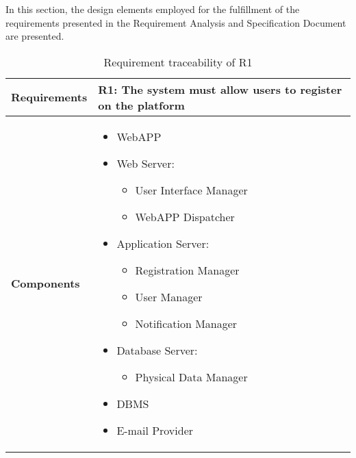 In this section, the design elements employed for the fulfillment of the requirements presented in the Requirement Analysis and Specification Document are presented.

\begin{table}[h!]
    \centering
    \begin{tabular}{|p{3cm}|p{12cm}|}    \hline
        \textbf{Requirements} & R1: The system must allow users to register on the platform \\
    \hline
        \textbf{Components} & 
            \begin{itemize}
                \item WebAPP
                \item Web Server:
                \begin{itemize}
                    \item User Interface Manager 
                    \item WebAPP Dispatcher
                \end{itemize}
                \item Application Server:
                \begin{itemize}
                    \item Registration Manager
                    \item User Manager
                    \item Notification Manager
                \end{itemize}
                \item Database Server:
                 \begin{itemize}
                    \item Physical Data Manager
                \end{itemize}
                \item DBMS
                \item E-mail Provider
            \end{itemize}    \\
        
    \hline
    \end{tabular}
    \caption{Requirement traceability of R1}
    \label{tab:r1}
\end{table}


